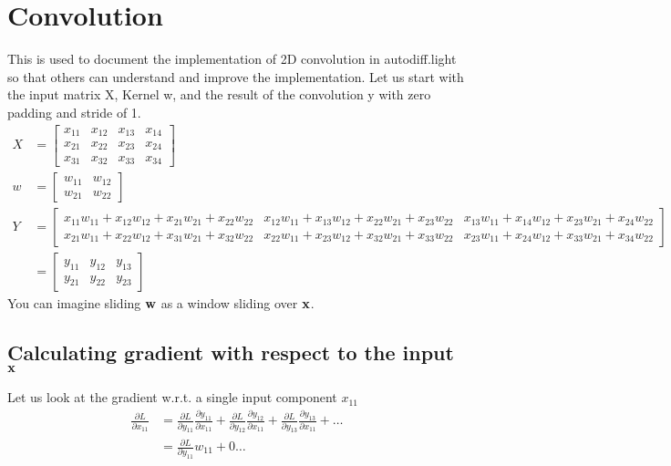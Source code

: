 \section{Convolution}
This is used to document the implementation of 2D convolution  in 
autodiff.light so that others can understand and improve the implementation. Let us start 
with the  input matrix X, Kernel w,  and the result of the convolution y with zero padding 
and stride of 1. 
\begin{equation*} 
\begin{aligned}
X &= 
	\begin{bmatrix}
	x_{11} & x_{12} & x_{13} & x_{14} \\
	x_{21} & x_{22} & x_{23} & x_{24} \\
	x_{31} & x_{32} & x_{33} & x_{34}
	\end{bmatrix}  
\\
w &= 
	\begin{bmatrix}
	w_{11} & w_{12} \\
	w_{21} & w_{22} 
	\end{bmatrix} 
\\
Y & = 
\begin{bmatrix}
	x_{11}w_{11}  + x_{12}w_{12}  + x_{21}w_{21}  + x_{22}w_{22} & 
	x_{12}w_{11}  + x_{13}w_{12}  + x_{22}w_{21}  + x_{23}w_{22} & 
	x_{13}w_{11}  + x_{14}w_{12}  + x_{23}w_{21}  + x_{24}w_{22} \\
	x_{21}w_{11}  + x_{22}w_{12}  + x_{31}w_{21}  + x_{32}w_{22} & 
	x_{22}w_{11}  + x_{23}w_{12}  + x_{32}w_{21}  + x_{33}w_{22} & 
	x_{23}w_{11}  + x_{24}w_{12}  + x_{33}w_{21}  + x_{34}w_{22} 
\end{bmatrix}  
\\
 & = 
 \begin{bmatrix}
	y_{11} & y_{12} & y_{13} \\
	y_{21} & y_{22} & y_{23} 
 \end{bmatrix}
\end{aligned} 
\end{equation*} 
You can imagine sliding ${\bf w}$ as a window sliding over ${\bf x}$. 

\subsection{Calculating gradient with respect to the input ${\bf x}$}
Let us look at the gradient w.r.t. a single input component $x_{11}$ 
\begin{equation*}
\begin{split}
\frac{\partial L}{\partial x_{11}} & = \frac{\partial L}{\partial y_{11}} \frac{\partial y_{11}}{\partial x_{11}} 
+ \frac{\partial L}{\partial y_{12}} \frac{\partial y_{12}}{\partial x_{11}} 
+ \frac{\partial L}{\partial y_{13}} \frac{\partial y_{13}}{\partial x_{11}} +\dots \\
  & = \frac{\partial L}{\partial y_{11}} w_{11} +0 \dots 
\end{split} 
\end{equation*}


